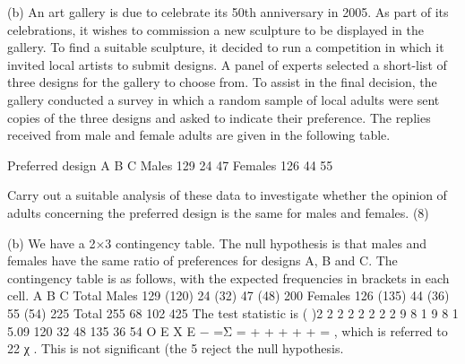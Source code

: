 \documentclass[a4paper,12pt]{article}
\begin{document}
\newpage
\begin{framed}
 
 (b) An art gallery is due to celebrate its 50th anniversary in 2005.  As part of its celebrations, it wishes to commission a new sculpture to be displayed in the gallery.  To find a suitable sculpture, it decided to run a competition in which it invited local artists to submit designs.  A panel of experts selected a short-list of three designs for the gallery to choose from.  To assist in the final decision, the gallery conducted a survey in which a random sample of local adults were sent copies of the three designs and asked to indicate their preference.  The replies received from male and female adults are given in the following table. 
 
 Preferred design  A B C
 Males 129 24 47 Females 126 44 55 
 
Carry out a suitable analysis of these data to investigate whether the opinion of adults concerning the preferred design is the same for males and females. (8) 
 
\end{framed}
(b) We have a 2×3 contingency table. The null hypothesis is that males and
females have the same ratio of preferences for designs A, B and C. The contingency
table is as follows, with the expected frequencies in brackets in each cell.
A B C Total
Males 129 (120) 24 (32) 47 (48) 200
Females 126 (135) 44 (36) 55 (54) 225
Total 255 68 102 425
The test statistic is
( )2 2 2 2 2 2 2
2 9 8 1 9 8 1 5.09
120 32 48 135 36 54
O E
X
E
−
=Σ = + + + + + = ,
which is referred to 22
χ . This is not significant (the 5%
reject the null hypothesis.
\end{document}
